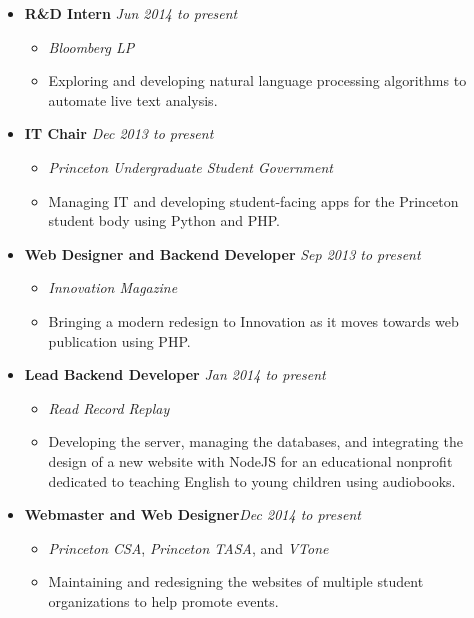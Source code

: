 \documentclass[11pt]{article}
\begin{document}
\begin{itemize}[nolistsep,topsep=0pt, label=]
\itemsep0.33em
\item \textbf{R\&D Intern}  \hfill \emph{Jun 2014 to present}
\begin{itemize}[nolistsep,topsep=0pt, label=]
\item \emph{Bloomberg LP} 
\item Exploring and developing natural language processing algorithms to automate live text analysis.
\end{itemize}

\item \textbf{IT Chair}  \hfill \emph{Dec 2013 to present}
\begin{itemize}[nolistsep,topsep=0pt, label=]
\item \emph{Princeton Undergraduate Student Government} 
\item Managing IT and developing student-facing apps for the Princeton student body using Python and PHP.
\end{itemize}

\item \textbf{Web Designer and Backend Developer} \hfill\emph{Sep 2013 to present}
\begin{itemize}[nolistsep,topsep=0pt, label=]
\item \emph{Innovation Magazine}  
\item Bringing a modern redesign to Innovation as it moves towards web publication using PHP.
\end{itemize}

\item \textbf{Lead Backend Developer}  \hfill\emph{Jan 2014 to present}
\begin{itemize}[nolistsep,topsep=0pt, label=]
\item \emph{Read Record Replay}
\item Developing the server, managing the databases, and integrating the design of a new website with NodeJS for an educational nonprofit dedicated to teaching English to young children using audiobooks.
\end{itemize}

\item \textbf{Webmaster and Web Designer}\hfill \emph{Dec 2014 to present}
\begin{itemize}[nolistsep,topsep=0pt, label=]
\item \emph{Princeton CSA}, \emph{Princeton TASA}, and \emph{VTone}
\item Maintaining and redesigning the websites of multiple student organizations to help promote events.
\end{itemize}


\end{itemize}
\end{document}
